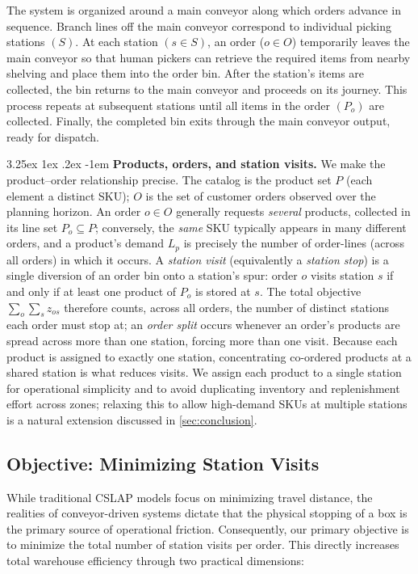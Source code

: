 \documentclass[preprint,review,11pt,authoryear]{elsarticle}
\makeatletter
\renewcommand\paragraph{\@startsection{paragraph}{4}{\z@}
  {3.25ex \@plus1ex \@minus.2ex}
  {-1em}
  {\normalfont\normalsize\itshape}}
\makeatother
\begin{document}
The system is organized around a main conveyor along which orders advance in sequence. Branch lines off the main conveyor correspond to individual picking stations $(S)$. At each station $(s \in S)$, an order ($o \in O$) temporarily leaves the main conveyor so that human pickers can retrieve the required items from nearby shelving and place them into the order bin. After the station’s items are collected, the bin returns to the main conveyor and proceeds on its journey. This process repeats at subsequent stations until all items in the order $(P_o)$ are collected. Finally, the completed bin exits through the main conveyor output, ready for dispatch.

\paragraph{\textbf{Products, orders, and station visits.}} We make the product--order relationship precise. The catalog is the product set $P$ (each element a distinct SKU); $O$ is the set of customer orders observed over the planning horizon. An order $o \in O$ generally requests \emph{several} products, collected in its line set $P_o \subseteq P$; conversely, the \emph{same} SKU typically appears in many different orders, and a product's demand $L_p$ is precisely the number of order-lines (across all orders) in which it occurs. A \emph{station visit} (equivalently a \emph{station stop}) is a single diversion of an order bin onto a station's spur: order $o$ visits station $s$ if and only if at least one product of $P_o$ is stored at $s$. The total objective $\sum_{o}\sum_{s} z_{os}$ therefore counts, across all orders, the number of distinct stations each order must stop at; an \emph{order split} occurs whenever an order's products are spread across more than one station, forcing more than one visit. Because each product is assigned to exactly one station, concentrating co-ordered products at a shared station is what reduces visits. We assign each product to a single station for operational simplicity and to avoid duplicating inventory and replenishment effort across zones; relaxing this to allow high-demand SKUs at multiple stations is a natural extension discussed in \cref{sec:conclusion}.

\subsection{Objective: Minimizing Station Visits}\label{par:minimizing_visits}
While traditional CSLAP models focus on minimizing travel distance, the realities of conveyor-driven systems dictate that the physical stopping of a box is the primary source of operational friction. Consequently, our primary objective is to minimize the total number of station visits per order. This directly increases total warehouse efficiency through two practical dimensions:
\end{document}
